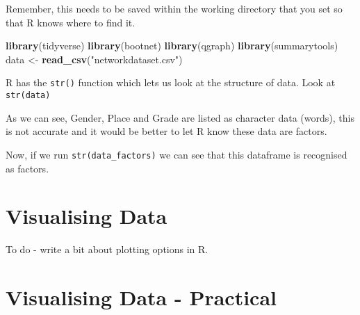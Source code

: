 \documentclass[]{book}
\newenvironment{Shaded}{\begin{snugshade}}{\end{snugshade}}
\newcommand{\DataTypeTok}[1]{\textcolor[rgb]{0.13,0.29,0.53}{#1}}
\newcommand{\KeywordTok}[1]{\textcolor[rgb]{0.13,0.29,0.53}{\textbf{#1}}}
\newcommand{\NormalTok}[1]{#1}
\newcommand{\OperatorTok}[1]{\textcolor[rgb]{0.81,0.36,0.00}{\textbf{#1}}}
\newcommand{\StringTok}[1]{\textcolor[rgb]{0.31,0.60,0.02}{#1}}
\begin{document}
Remember, this needs to be saved within the working directory that you set so that R knows where to find it.

\begin{Shaded}
\begin{Highlighting}[]
\KeywordTok{library}\NormalTok{(tidyverse)}
\KeywordTok{library}\NormalTok{(bootnet)}
\KeywordTok{library}\NormalTok{(qgraph)}
\KeywordTok{library}\NormalTok{(summarytools)}
\NormalTok{data <-}\StringTok{ }\KeywordTok{read_csv}\NormalTok{(}\StringTok{"networkdataset.csv"}\NormalTok{)}
\end{Highlighting}
\end{Shaded}

R has the \texttt{str()} function which lets us look at the structure of data. Look at \texttt{str(data)}

As we can see, Gender, Place and Grade are listed as character data (words), this is not accurate and it would be better to let R know these data are factors.

\begin{Shaded}
\end{Shaded}

Now, if we run \texttt{str(data\_factors)} we can see that this dataframe is recognised as factors.

\hypertarget{visualising-data}{%
\section{Visualising Data}\label{visualising-data}}

To do - write a bit about plotting options in R.

\hypertarget{visualising-data---practical}{%
\section{Visualising Data - Practical}\label{visualising-data---practical}}
\end{document}
